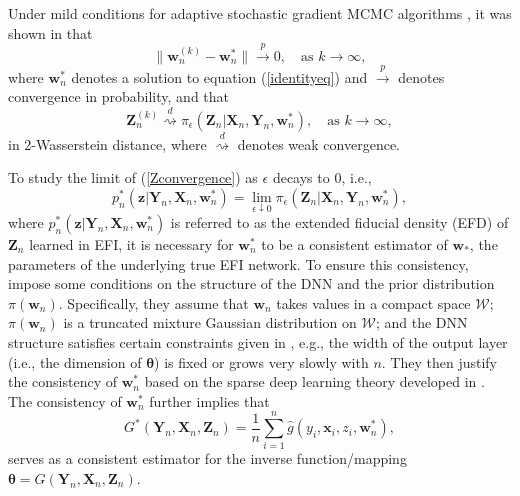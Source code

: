 \documentclass[11pt]{article}
\newcommand{\bX}{{\boldsymbol X}}
\newcommand{\bY}{{\boldsymbol Y}}
\newcommand{\bx}{{\boldsymbol x}}
\newcommand{\bz}{{\boldsymbol z}}
\newcommand{\bZ}{{\boldsymbol Z}}
\newcommand{\bw}{{\boldsymbol w}}
\newcommand{\btheta}{{\boldsymbol \theta}}
\begin{document}

Under mild conditions for adaptive stochastic gradient 
MCMC algorithms \citep{deng2019adaptive,LiangSLiang2022}, it was shown in \cite{LiangKS2024EFI} that 
\begin{equation} \label{wconvergence}
\|\bw_n^{(k)} -\bw_n^* \|\stackrel{p}{\to} 0, \quad \mbox{as $k\to \infty$},
\end{equation}
 where $\bw_n^*$ denotes a solution to equation (\ref{identityeq}) and $\stackrel{p}{\to}$ denotes convergence in probability, and  that 
\begin{equation} \label{Zconvergence}
\bZ_n^{(k)} \stackrel{d}{\rightsquigarrow} \pi_{\epsilon}(\bZ_n|\bX_n,\bY_n,\bw_n^*), 
\quad \mbox{as $k \to \infty$},
\end{equation}
in 2-Wasserstein distance, where  $\stackrel{d}{\rightsquigarrow}$ denotes weak convergence. 

To study the limit of (\ref{Zconvergence}) as $\epsilon$ decays to 0, i.e.,  
\[
p_n^*(\bz|\bY_n,\bX_n,\bw_n^*)=  
\lim_{\epsilon \downarrow 0} \pi_{\epsilon}(\bZ_n|\bX_n,\bY_n,\bw_n^*),
\]
where 
$p_n^*(\bz|\bY_n,\bX_n,\bw_n^*)$ 
is referred to as the extended fiducial 
density (EFD) of $\bZ_n$ learned in EFI, 
it is necessary for $\bw_n^*$ to be a consistent estimator of $\bw_*$, the parameters 
of the underlying true EFI network.
To ensure this consistency, \cite{LiangKS2024EFI} impose some conditions on the structure of the DNN 
 and the prior distribution $\pi(\bw_n)$. Specifically, they assume that $\bw_n$ takes values in a compact space $\mathcal{W}$; $\pi(\bw_n)$ is a truncated mixture Gaussian distribution on  $\mathcal{W}$; and the DNN structure satisfies certain constraints given in \cite{SunSLiang2021}, e.g., the width of the output layer (i.e., the dimension of $\btheta$) is fixed or grows very slowly with $n$. They then 
 justify the consistency of $\bw_n^*$  based on the sparse 
 deep learning theory developed in \cite{SunSLiang2021}. 
 The consistency of $\bw_n^*$ further implies that 
 \[
 G^*(\bY_n,\bX_n,\bZ_n)= \frac{1}{n} \sum_{i=1}^n \hat{g}(y_i,\bx_i,z_i,\bw_n^*),
 \]
 serves as a consistent estimator for the inverse 
function/mapping $\btheta=G(\bY_n,\bX_n,\bZ_n)$.
 
\end{document}
